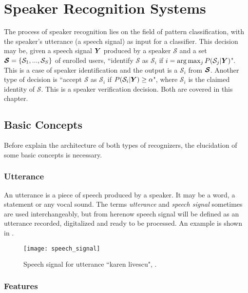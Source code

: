 \chapter{Speaker Recognition Systems}
\label{ch:speaker-recognition-system}

The process of speaker recognition lies on the field of pattern classification, with the speaker's utterance (a speech signal) as input for a classifier. This decision may be, given a speech signal $\boldsymbol{Y}$ produced by a speaker $\mathcal{S}$ and a set $\boldsymbol{\mathcal{S}} = \{\mathcal{S}_1, ..., \mathcal{S}_S\}$ of enrolled users, ``identify $\mathcal{S}$ as $\mathcal{S}_i$ if $i = \arg\max_j P(\mathcal{S}_j|\boldsymbol{Y})$". This is a case of speaker identification and the output is a $\mathcal{S}_i$ from $\boldsymbol{\mathcal{S}}$. Another type of decision is ``accept $\mathcal{S}$ as $\mathcal{S}_i$ if $P(\mathcal{S}_i|\boldsymbol{Y}) \geq \alpha$", where $\mathcal{S}_i$ is the claimed identity of $\mathcal{S}$. This is a speaker verification decision. Both are covered in this chapter.

\section{Basic Concepts}

Before explain the architecture of both types of recognizers, the elucidation of some basic concepts is necessary.

\subsection{Utterance}

An utterance is a piece of speech produced by a speaker. It may be a word, a statement or any vocal sound. The terms \emph{utterance} and \emph{speech signal} sometimes are used interchangeably, but from herenow speech signal will be defined as an utterance recorded, digitalized and ready to be processed. An example is shown in .

\begin{figure}[ht]
    \centering
    \texttt{[image: speech\_signal]}
    \caption{Speech signal for utterance ``karen livescu", .}
    \label{fig:speech_signal}
\end{figure}

\subsection{Features}

